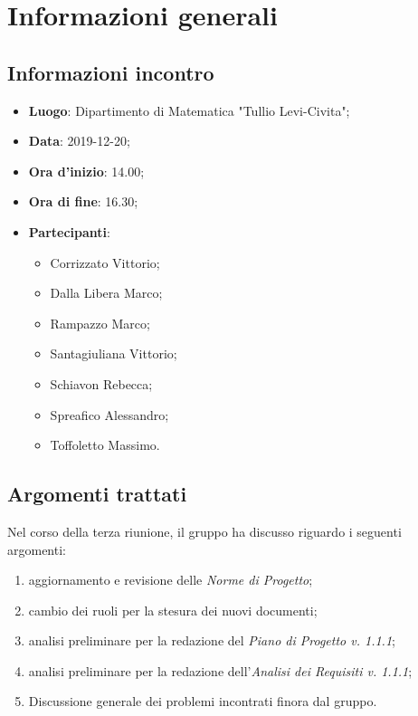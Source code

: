 \section{Informazioni generali}
    \subsection{Informazioni incontro}
        \begin{itemize}
            \item \textbf{Luogo}: Dipartimento di Matematica "Tullio Levi-Civita";
            \item \textbf{Data}: 2019-12-20;
            \item \textbf{Ora d'inizio}: 14.00;
            \item \textbf{Ora di fine}: 16.30;
            \item \textbf{Partecipanti}: \begin{itemize}
                \item Corrizzato Vittorio;
                \item Dalla Libera Marco;
                \item Rampazzo Marco;
                \item Santagiuliana Vittorio;
                \item Schiavon Rebecca;
                \item Spreafico Alessandro;
                \item Toffoletto Massimo.
            \end{itemize}
        \end{itemize}
    \subsection{Argomenti trattati}
        Nel corso della terza riunione, il gruppo ha discusso riguardo i seguenti argomenti:
        \begin{enumerate}
            \item aggiornamento e revisione delle \textit{Norme di Progetto};
            \item cambio dei ruoli per la stesura dei nuovi documenti;
            \item analisi preliminare per la redazione del \textit{Piano di Progetto v. 1.1.1};
            \item analisi preliminare per la redazione dell'\textit{Analisi dei Requisiti v. 1.1.1};
            \item Discussione generale dei problemi incontrati finora dal gruppo.
        \end{enumerate}
